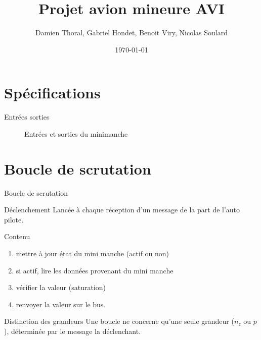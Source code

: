 \documentclass[footheight=2em]{beamer}
\title{Projet avion mineure AVI}
\author{Damien Thoral, Gabriel Hondet, Benoit Viry, Nicolas Soulard}
\date{\today}
\begin{document}
\frame{\titlepage}


\section{Spécifications}
\begin{frame}[t]{Entrées sorties}
  \begin{scriptsize}
    \begin{figure}
      \centering
      \caption{Entrées et sorties du minimanche}
      \label{fig:io}
    \end{figure}
  \end{scriptsize}
\end{frame}

\section{Boucle de scrutation}
\begin{frame}[t]{Boucle de scrutation}
  \begin{block}{Déclenchement}
    Lancée à chaque réception d'un message de la part de l'auto pilote.
  \end{block}
  \pause
  \begin{block}{Contenu}
    \begin{enumerate}
      \item mettre à jour état du mini manche (actif ou non)
      \item si actif, lire les données provenant du mini manche
      \item vérifier la valeur (saturation)
      \item renvoyer la valeur sur le bus.
    \end{enumerate}
  \end{block}
  \pause
  \begin{block}{Distinction des grandeurs}
    Une boucle ne concerne qu'une seule grandeur (\(n_z\) ou \(p\)),
    déterminée par le message la déclenchant.
  \end{block}
\end{frame}
\end{document}
